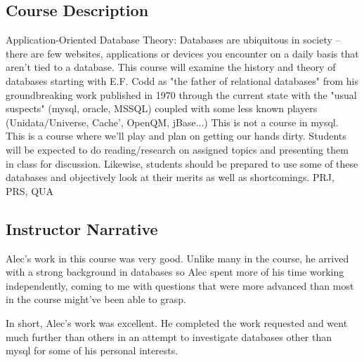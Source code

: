 
\subsection*{Course Description}
Application-Oriented Database Theory: Databases are ubiquitous in
society -- there are few websites, applications or devices you encounter
on a daily basis that aren't tied to a database. This course will
examine the history and theory of databases starting with E.F. Codd
as "the father of relational databases" from his groundbreaking
work published in 1970 through the current state with the "usual
suspects" (mysql, oracle, MSSQL) coupled with some less known players
(Unidata/Universe, Cache', OpenQM, jBase...) This is not a course in
mysql. This is a course where we'll play and plan on getting our hands
dirty. Students will be expected to do reading/research on assigned
topics and presenting them in class for discussion. Likewise, students
should be prepared to use some of these databases and objectively look
at their merits as well as shortcomings. PRJ, PRS, QUA

\subsection*{Instructor Narrative}
Alec's work in this course was very good. Unlike many in the course, he
arrived with a strong background in databases so Alec spent more of his
time working independently, coming to me with questions that were more
advanced than most in the course might've been able to grasp.

In short, Alec's work was excellent. He completed the work requested and
went much further than others in an attempt to investigate databases
other than mysql for some of his personal interests.
